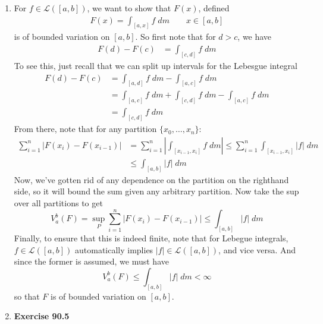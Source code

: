 \documentclass[12pt]{article}
\theoremstyle{plain}
\theoremstyle{definition}
\theoremstyle{remark}
\begin{document}
\begin{enumerate}
\item For $f\in\mathscr{L}([a,b])$, we want to show that $F(x)$, defined
\begin{align*}
    F(x) = \int_{[a,x]} f \; dm \qquad x\in[a,b]
\end{align*}
is of bounded variation on $[a,b]$. So first note that for $d>c$, we have
\begin{align*}
    F(d) - F(c) &= \int_{[c,d]} f \; dm
\end{align*}
To see this, just recall that we can split up intervals for the Lebesgue integral 
\begin{align*}
    F(d) - F(c) &= 
        \int_{[a,d]} f \; dm - \int_{[a,c]} f \; dm \\
    &= \int_{[a,c]} f \; dm 
        + \int_{[c,d]} f \; dm- \int_{[a,c]} f \; dm \\
    &= \int_{[c,d]} f \; dm
\end{align*}
From there, note that for any partition $\{x_0, \ldots, x_n\}$:
\begin{align*}
    \sum^n_{i=1} |F(x_i) - F(x_{i-1})| &= 
    \sum^n_{i=1} \left\lvert\int_{[x_{i-1},x_i]}f \; dm
    \right\rvert \leq  
    \sum^n_{i=1} \int_{[x_{i-1},x_i]}|f| \; dm \\
    &\leq \int_{[a,b]}|f| \; dm 
\end{align*}
Now, we've gotten rid of any dependence on the partition on the righthand side, so it will bound the sum given any arbitrary partition. Now take the sup over all partitions to get
\[
    V_a^b(F) = \sup_P
    \sum^n_{i=1} |F(x_i) - F(x_{i-1})| \leq
    \int_{[a,b]}|f| \; dm 
\]
Finally, to ensure that this is indeed finite, note that for Lebegue integrals, $f\in\mathscr{L}([a,b])$ automatically implies $|f|\in\mathscr{L}([a,b])$, and vice versa. And since the former is assumed, we must have
\[
    V_a^b(F) \leq 
    \int_{[a,b]}|f| \; dm  <\infty
\]
so that $F$ is of bounded variation on $[a,b]$.


\newpage
\item \textbf{Exercise 90.5}
\begin{enumerate} 


\end{enumerate}
\end{enumerate}
\end{document}
